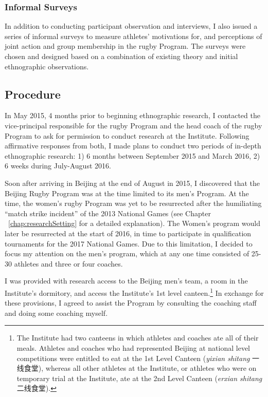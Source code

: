 \begin{CJK}{UTF8}{gbsn}
  \subsubsection{Informal Surveys}
  In addition to conducting participant observation and interviews, I also issued a series of informal surveys to measure athletes' motivations for, and perceptions of joint action and group membership in the rugby Program.  The surveys were chosen and designed based on a combination of existing theory and initial ethnographic observations.


\subsection{Procedure}

In May 2015, 4 months prior to beginning ethnographic research, I contacted the vice-principal responsible for the rugby Program and the head coach of the rugby Program to ask for permission to conduct research at the Institute.  Following affirmative responses from both, I made plans to conduct two periods of in-depth ethnographic research: 1) 6 months between September 2015 and March 2016, 2) 6 weeks during July-August 2016.

Soon after arriving in Beijing at the end of August in 2015, I discovered that the Beijing Rugby Program was at the time limited to its men's Program.  At the time, the women's rugby Program was yet to be resurrected after the humiliating ``match strike incident'' of the 2013 National Games (see Chapter ~\ref{chap:researchSetting} for a detailed explanation).  The Women's program would later be resurrected at the start of 2016, in time to participate in qualification tournaments for the 2017 National Games.  Due to this limitation, I decided to focus my attention on the men's program, which at any one time consisted of 25-30 athletes and three or four coaches.

I was provided with research access to the Beijing men's team, a room in the Institute's dormitory, and access the Institute's 1st level canteen.\footnote{The Institute had two canteens in which athletes and coaches ate all of their meals.  Athletes and coaches who had represented Beijing at national level competitions were entitled to eat at the 1st Level Canteen (\textit{yixian shitang} 一线食堂), whereas all other athletes at the Institute, or athletes who were on temporary trial at the Institute, ate at the 2nd Level Canteen (\textit{erxian shitang} 二线食堂).}  In exchange for these provisions, I agreed to assist the Program by consulting the coaching staff and doing some coaching myself.


\end{CJK}
